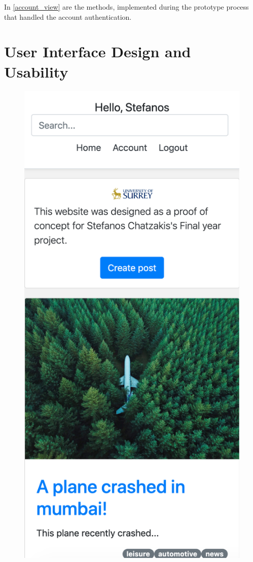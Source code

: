 In \ref{account_view} are the methods, implemented during the prototype process that handled the account authentication.

\section{User Interface Design and Usability}

\begin{figure}[htbp]
\begin{minipage}[t]{0.45\linewidth}
    \includegraphics[width=\linewidth]{Figures/home_mobile}

\end{minipage}
\end{figure}
